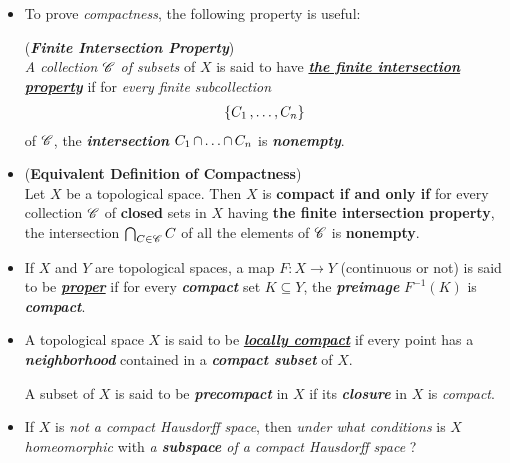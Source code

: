 \documentclass[11pt]{article}
\begin{document}
\begin{itemize}
\item To prove \emph{compactness}, the following property is useful:
\begin{definition} (\emph{\textbf{Finite Intersection Property}})\\
\emph{A collection ${\mathscr C}$ of subsets} of $X$ is said to have \underline{\emph{\textbf{the finite intersection property}}} if for \emph{every finite subcollection}
\begin{align*}
\{C_1 \,{,}\ldots{,}\, C_n\}
\end{align*}
 of ${\mathscr C}$, the \emph{\textbf{intersection}} $C_1 \,{\cap}\ldots{\cap}\, C_n$ is \emph{\textbf{nonempty}}.
\end{definition}

\item \begin{proposition} (\textbf{Equivalent Definition of Compactness}) \citep{munkres2000topology} \\
Let $X$ be a topological space. Then $X$ is \textbf{compact} \textbf{if and only if} for every collection ${\mathscr C}$ of \textbf{closed} sets in $X$ having \textbf{the finite intersection property}, the intersection $\bigcap_{C\in {\mathscr C}}C$ of all the elements of ${\mathscr C}$ is \textbf{nonempty}.
\end{proposition}


\item \begin{definition}
If $X$ and $Y$ are topological spaces, a map $F: X \rightarrow Y$ (continuous or not) is said to be \underline{\emph{\textbf{proper}}} if for every \textbf{\emph{compact}} set $K \subseteq Y$, the \emph{\textbf{preimage}} $F^{-1}(K)$ is \emph{\textbf{compact}}.
\end{definition}

\item \begin{definition}
A topological space $X$ is said to be \underline{\emph{\textbf{locally compact}}} if every point has a \emph{\textbf{neighborhood}} contained in a \emph{\textbf{compact subset}} of $X$. 

A subset of $X$ is said to be \emph{\textbf{precompact}} in $X$ if its \emph{\textbf{closure}} in $X$ is \emph{compact}.
\end{definition}



\item If $X$ is \emph{not a compact Hausdorff space}, then \emph{under what conditions} is $X$ \emph{homeomorphic} with \emph{a \textbf{subspace} of a compact Hausdorff space} ?


\end{itemize}
\end{document}
